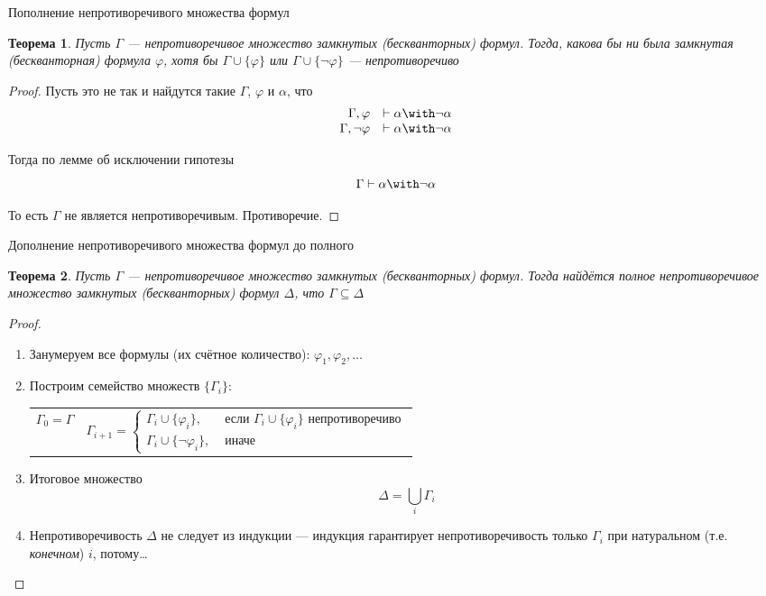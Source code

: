 \documentclass[aspectratio=169]{beamer}
\newtheorem{thm}{Теорема}[section]
\begin{document}
\begin{frame}{Пополнение непротиворечивого множества формул}
\begin{thm}Пусть $\Gamma$ --- непротиворечивое множество замкнутых (бескванторных) формул. Тогда, какова бы ни была
замкнутая (бескванторная) формула $\varphi$, хотя бы $\Gamma \cup \{\varphi\}$ или $\Gamma \cup \{\neg\varphi\}$ ---
непротиворечиво\end{thm}\pause

\begin{proof}
Пусть это не так и найдутся такие $\Gamma$, $\varphi$ и $\alpha$, что
 $$\begin{array}{rl}\Gamma,\varphi & \vdash \alpha\with\neg\alpha\\
                    \Gamma,\neg\varphi & \vdash \alpha \with\neg\alpha\end{array}$$\pause\vspace{-0.3cm}

Тогда по лемме об исключении гипотезы
$$\Gamma\vdash \alpha\with\neg\alpha$$\pause\vspace{-0.4cm}

То есть $\Gamma$ не является непротиворечивым. Противоречие.
\end{proof}
\end{frame}

\begin{frame}{Дополнение непротиворечивого множества формул до полного}
\begin{thm}Пусть $\Gamma$ --- непротиворечивое множество замкнутых (бескванторных) формул. Тогда
найдётся полное непротиворечивое множество замкнутых (бескванторных) формул $\Delta$, что
$\Gamma \subseteq \Delta$
\end{thm}\pause

\begin{proof}
\begin{enumerate}
\item Занумеруем все формулы (их счётное количество): $\varphi_1, \varphi_2, \dots$\pause
\item Построим семейство множеств $\{\Gamma_i\}$:
\begin{tabular}{cc}
$\Gamma_0 = \Gamma$  &
\begin{minipage}{12cm}
$$\Gamma_{i+1} = \left\{\begin{array}{ll}\Gamma_i \cup \{\varphi_i\},& \mbox{ если } \Gamma_i \cup \{\varphi_i\} \mbox{ непротиворечиво}\\
                                               \Gamma_i \cup \{\neg\varphi_i\},& \mbox{ иначе}\end{array}\right.$$
\end{minipage}\end{tabular}\pause
\item Итоговое множество $$\Delta = \bigcup_i \Gamma_i$$\pause\vspace{-0.2cm}
\item Непротиворечивость $\Delta$ не следует из индукции --- индукция гарантирует непротиворечивость
      только $\Gamma_i$ при натуральном (т.е. \emph{конечном}) $i$, потому\dots
\end{enumerate}
\end{proof}
\end{frame}
\end{document}
